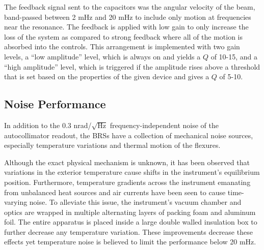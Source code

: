 \documentclass [12pt, proquest]{uwthesis}[2019]
\begin{document}
The feedback signal sent to the capacitors was the angular velocity of the beam, band-passed between 2 mHz and 20 mHz to include only motion at frequencies near the resonance. The feedback is applied with low gain to only increase the loss of the system as compared to strong feedback where all of the motion is absorbed into the controls. This arrangement is implemented with two gain levels, a ``low amplitude'' level, which is always on and yields a $Q$ of 10-15, and a ``high amplitude'' level, which is triggered if the amplitude rises above a threshold that is set based on the properties of the given device and gives a $Q$ of 5-10.

\subsection{Noise Performance}\label{BRSNoise}

In addition to the 0.3 nrad/$\sqrt{\text{Hz}}$ frequency-independent noise of the autocollimator readout, the BRSs have a collection of mechanical noise sources, especially temperature variations and thermal motion of the flexures.

Although the exact physical mechanism is unknown, it has been observed that variations in the exterior temperature cause shifts in the instrument's equilibrium position. Furthermore, temperature gradients across the instrument emanating from unbalanced heat sources and air currents have been seen to cause time-varying noise. To alleviate this issue, the instrument's vacuum chamber and optics are wrapped in multiple alternating layers of packing foam and aluminum foil. The entire apparatus is placed inside a large double walled insulation box to further decrease any temperature variation. These improvements decrease these effects yet temperature noise is believed to limit the performance below 20 mHz.
\end{document}
